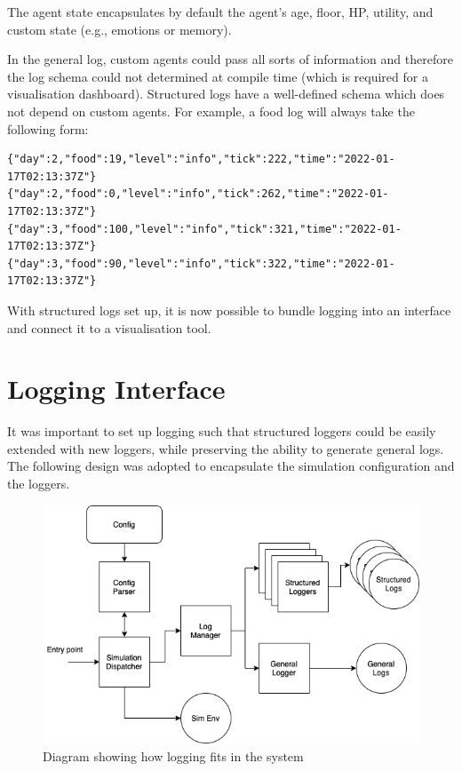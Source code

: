 The agent state encapsulates by default the agent's age, floor, HP, utility, and custom state (e.g., emotions or memory).

In the general log, custom agents could pass all sorts of information and therefore the log schema could not determined at compile time (which is required for a visualisation dashboard). Structured logs have a well-defined schema which does not depend on custom agents. For example, a food log will always take the following form:

\begin{verbatim}
{"day":2,"food":19,"level":"info","tick":222,"time":"2022-01-17T02:13:37Z"}
{"day":2,"food":0,"level":"info","tick":262,"time":"2022-01-17T02:13:37Z"}
{"day":3,"food":100,"level":"info","tick":321,"time":"2022-01-17T02:13:37Z"}
{"day":3,"food":90,"level":"info","tick":322,"time":"2022-01-17T02:13:37Z"}
\end{verbatim}

With structured logs set up, it is now possible to bundle logging into an interface and connect it to a visualisation tool.

\section{Logging Interface}

It was important to set up logging such that structured loggers could be easily extended with new loggers, while preserving the ability to generate general logs. The following design was adopted to encapsulate the simulation configuration and the loggers.

\begin{figure}[htb]
    \centering
    \includegraphics[width=0.8\linewidth]{003_data_logging/images/struct.png}
    \caption{Diagram showing how logging fits in the system}
    \label{fig:design_logging}
\end{figure}


